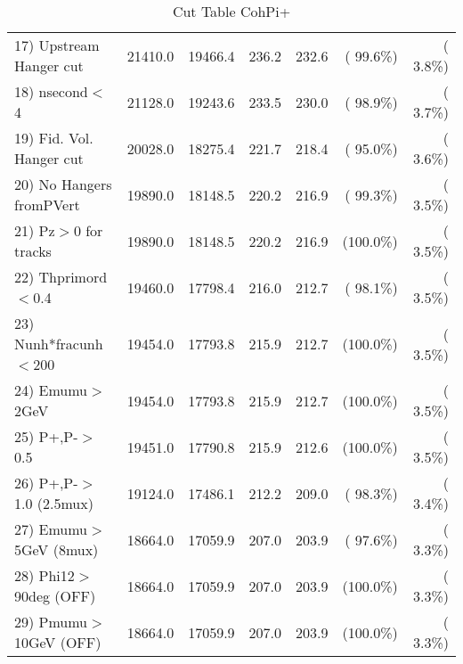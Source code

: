 \begin{table}[h!]
\begin{tabular}{||l||r|r|r|r|r|r||}
 17) Upstream Hanger cut  &      21410.0 &      19466.4 &        236.2 &        232.6 & ( 99.6\%) & (  3.8\%) \\
 18) nsecond$<$4          &      21128.0 &      19243.6 &        233.5 &        230.0 & ( 98.9\%) & (  3.7\%) \\
 19) Fid. Vol. Hanger cut &      20028.0 &      18275.4 &        221.7 &        218.4 & ( 95.0\%) & (  3.6\%) \\
 20) No Hangers fromPVert &      19890.0 &      18148.5 &        220.2 &        216.9 & ( 99.3\%) & (  3.5\%) \\
 21) Pz$>$0 for tracks    &      19890.0 &      18148.5 &        220.2 &        216.9 & (100.0\%) & (  3.5\%) \\
 22) Thprimord$<$0.4      &      19460.0 &      17798.4 &        216.0 &        212.7 & ( 98.1\%) & (  3.5\%) \\
 23) Nunh*fracunh$<$200   &      19454.0 &      17793.8 &        215.9 &        212.7 & (100.0\%) & (  3.5\%) \\
 24) Emumu$>$2GeV         &      19454.0 &      17793.8 &        215.9 &        212.7 & (100.0\%) & (  3.5\%) \\
 25) P+,P-$>$0.5          &      19451.0 &      17790.8 &        215.9 &        212.6 & (100.0\%) & (  3.5\%) \\
 26) P+,P-$>$1.0 (2.5mux) &      19124.0 &      17486.1 &        212.2 &        209.0 & ( 98.3\%) & (  3.4\%) \\
 27) Emumu$>$5GeV  (8mux) &      18664.0 &      17059.9 &        207.0 &        203.9 & ( 97.6\%) & (  3.3\%) \\
 28) Phi12$>$90deg  (OFF) &      18664.0 &      17059.9 &        207.0 &        203.9 & (100.0\%) & (  3.3\%) \\
 29) Pmumu$>$10GeV  (OFF) &      18664.0 &      17059.9 &        207.0 &        203.9 & (100.0\%) & (  3.3\%) \\
 \hline
 \hline
 \end{tabular}
 \caption{Cut Table  CohPi+   }
 \label{tab-cutcohjpsi-mumu_cohpip}
 \end{table}
